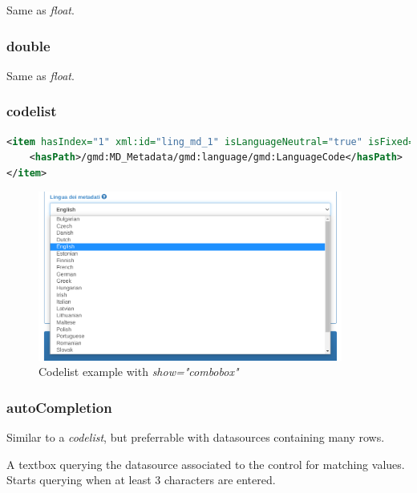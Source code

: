 \documentclass[10pt]{article}
\begin{document}
Same as \textit{float}.

\subsubsection{double}
\label{double}

Same as \textit{float}.


\subsubsection{codelist}
\label{codelist}

\begin{lstlisting}[language=xml]
 <item hasIndex="1" xml:id="ling_md_1" isLanguageNeutral="true" isFixed="false" hasDatatype="codelist" datasource="languages" show="combobox">
	<hasPath>/gmd:MD_Metadata/gmd:language/gmd:LanguageCode</hasPath>
</item>
\end{lstlisting}
\begin{figure}[h]
	\caption{Codelist example with \textit{show="combobox"}}
	\includegraphics[width=10cm]{Codelist.png}
	\centering
\end{figure}

\subsubsection{autoCompletion}
\label{autoCompletion}

Similar to a \textit{codelist}, but preferrable with datasources containing many rows.

A textbox querying the datasource associated to the control for matching values.
Starts querying when at least 3 characters are entered.
\end{document}
